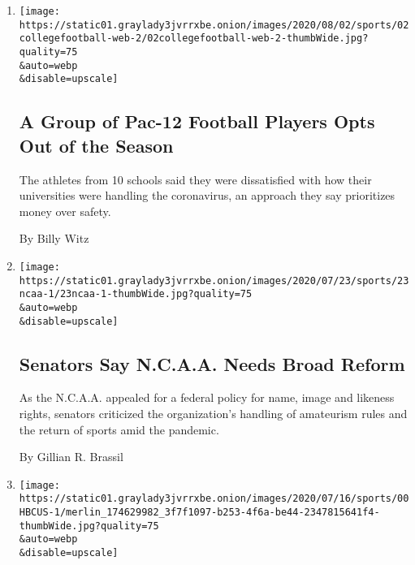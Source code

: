 \begin{enumerate}
\def\labelenumi{\arabic{enumi}.}
\item
  \href{/2020/08/02/sports/ncaafootball/coronavirus-college-football-pac-12.html}{}

  \texttt{[image: https://static01.graylady3jvrrxbe.onion/images/2020/08/02/sports/02collegefootball-web-2/02collegefootball-web-2-thumbWide.jpg?quality=75\\\&auto=webp\\\&disable=upscale]}

  \hypertarget{a-group-of-pac-12-football-players-opts-out-of-the-season}{%
  \subsection{A Group of Pac-12 Football Players Opts Out of the
  Season}\label{a-group-of-pac-12-football-players-opts-out-of-the-season}}

  The athletes from 10 schools said they were dissatisfied with how
  their universities were handling the coronavirus, an approach they say
  prioritizes money over safety.

  By Billy Witz
\item
  \href{/2020/07/23/sports/ncaa-NIL-rights.html}{}

  \texttt{[image: https://static01.graylady3jvrrxbe.onion/images/2020/07/23/sports/23ncaa-1/23ncaa-1-thumbWide.jpg?quality=75\\\&auto=webp\\\&disable=upscale]}

  \hypertarget{senators-say-ncaa-needs-broad-reform}{%
  \subsection{Senators Say N.C.A.A. Needs Broad
  Reform}\label{senators-say-ncaa-needs-broad-reform}}

  As the N.C.A.A. appealed for a federal policy for name, image and
  likeness rights, senators criticized the organization's handling of
  amateurism rules and the return of sports amid the pandemic.

  By Gillian R. Brassil
\item
  \href{/2020/07/22/sports/ncaabasketball/black-lives-matter-hbcus-college-athletes.html}{}

  \texttt{[image: https://static01.graylady3jvrrxbe.onion/images/2020/07/16/sports/00HBCUS-1/merlin\_174629982\_3f7f1097-b253-4f6a-be44-2347815641f4-thumbWide.jpg?quality=75\\\&auto=webp\\\&disable=upscale]}

  \hypertarget{black-lives-matter-protests-spawn-push-for-athletes-to-attend-historically-black-colleges}{%
}
\end{enumerate}
